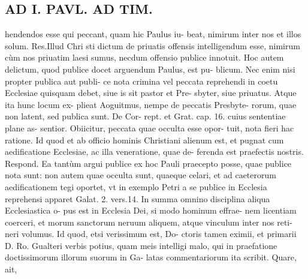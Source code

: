 \documentclass{article}
\begin{document}
\begin{pages}
\section*{AD I. PAVL. AD TIM. }
\marginpar{[ p.JI0 ]}\pstart hendendos esse qui peccant, quam hic Paulus iu- beat, nimirum inter nos et illos solum. Res.Illud Chri sti dictum de priuatis offensis intelligendum esse, nimirum cùm nos priuatim laesi sumus, necdum offensio publice innotuit. Hoc autem delictum, quod publice docet arguendum Paulus, est pu- blicum. Nec enim nisi propter publica aut publi- ce nota crimina vel peccata reprehendi in coetu Ecclesiae quisquam debet, siue is sit pastor et Pre- sbyter, siue priuatus. Atque ita hunc locum ex- plieat Aoguitmus, nempe de peccatis Presbyte- rorum, quae non latent, sed publica sunt. De Cor- rept. et Grat. cap. 16. cuius sententiae plane as- sentior.  \pend{} Obiicitur, peccata quae occulta esse opor- tuit, nota fieri hac ratione. Id quod et ab officio hominis Christiani alienum est, et pugnat cum aedificatione Ecclesiae, ac illa veneratione, quae de- ferenda est praefectis nostris. Respond. Ea tantùm argui publice ex hoc Pauli praecepto posse, quae publice nota sunt: non autem quae occulta sunt, quaeque celari, et ad caeterorum aedificationem tegi oportet, vt in exemplo Petri a se publice in Ecclesia reprehensi apparet Galat. 2. vers.14. In summa omnino disciplina aliqua Ecclesiastica o- pus est in Ecclesia Dei, si modo hominum effrae- nem licentiam coerceri, et morum sanctorum neruum aliquem, atque vinculum inter nos reti- neri volumus. Id quod, etsi verissimum est, Do- ctoris tamen eximii, et primarii D. Ro. Gualteri verbis potius, quam meis intelligi malo, qui in praefatione doctissimorum illorum suorum in Ga- latas commentariorum ita scribit. Quare, ait,  \pend

\end{pages}
\end{document}
